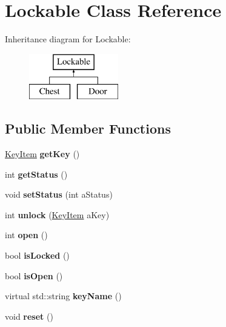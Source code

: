 \hypertarget{class_lockable}{}\section{Lockable Class Reference}
\label{class_lockable}
Inheritance diagram for Lockable\+:\begin{figure}[H]
\begin{center}
\leavevmode
\includegraphics[height=2.000000cm]{class_lockable}
\end{center}
\end{figure}
\subsection*{Public Member Functions}
\begin{DoxyCompactItemize}
\item 
\hypertarget{class_lockable_a41cbb1a47f33edbba4e7d8addf464102}{}\label{class_lockable_a41cbb1a47f33edbba4e7d8addf464102} 
\hyperlink{class_key_item}{Key\+Item} {\bfseries get\+Key} ()
\item 
\hypertarget{class_lockable_a6297adf59c34be6743690ffac934e1c3}{}\label{class_lockable_a6297adf59c34be6743690ffac934e1c3} 
int {\bfseries get\+Status} ()
\item 
\hypertarget{class_lockable_af1a63132342bc4bcb58d63f5ee4dc94a}{}\label{class_lockable_af1a63132342bc4bcb58d63f5ee4dc94a} 
void {\bfseries set\+Status} (int a\+Status)
\item 
\hypertarget{class_lockable_a99c6790e2b56bef4618a1f3a461b7c63}{}\label{class_lockable_a99c6790e2b56bef4618a1f3a461b7c63} 
int {\bfseries unlock} (\hyperlink{class_key_item}{Key\+Item} a\+Key)
\item 
\hypertarget{class_lockable_a5593ee3b706c7a47f0e0bc9035be3433}{}\label{class_lockable_a5593ee3b706c7a47f0e0bc9035be3433} 
int {\bfseries open} ()
\item 
\hypertarget{class_lockable_a7050cc99c85178d73aba1fe4c81161f5}{}\label{class_lockable_a7050cc99c85178d73aba1fe4c81161f5} 
bool {\bfseries is\+Locked} ()
\item 
\hypertarget{class_lockable_a3520cfcd7af2d8f3d2f5bb615be76f10}{}\label{class_lockable_a3520cfcd7af2d8f3d2f5bb615be76f10} 
bool {\bfseries is\+Open} ()
\item 
\hypertarget{class_lockable_a46cd55be38b7bd08e3fe5c39f80e412c}{}\label{class_lockable_a46cd55be38b7bd08e3fe5c39f80e412c} 
virtual std\+::string {\bfseries key\+Name} ()
\item 
\hypertarget{class_lockable_ad4bddb3c5f07a3a6130ac84810e67167}{}\label{class_lockable_ad4bddb3c5f07a3a6130ac84810e67167} 
void {\bfseries reset} ()
\end{DoxyCompactItemize}

